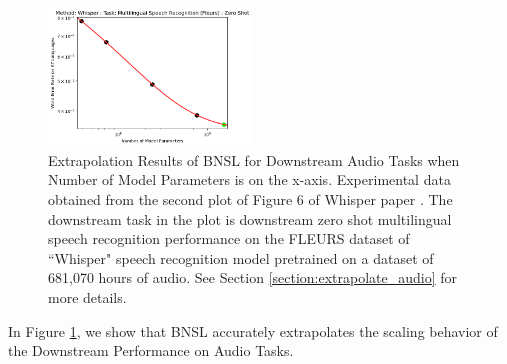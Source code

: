 \documentclass{article} %
\begin{document}
\begin{figure}[htbp]
    \centering
\includegraphics[width=0.48\textwidth]{figures/audio/whisper__parameter_scaling.png}

    \caption{
Extrapolation Results of BNSL for Downstream Audio Tasks when Number of Model Parameters is on the x-axis. Experimental data obtained from the second plot of Figure 6 of Whisper paper \citep{radford2022robust}. The downstream task in the plot is downstream zero shot multilingual speech recognition performance on the FLEURS dataset of ``Whisper" speech recognition model pretrained on a dataset of 681,070 hours of audio. See Section \ref{section:extrapolate_audio} for more details.
    }
    \label{fig:extrapolate_audio}
\end{figure}

In Figure \ref{fig:extrapolate_audio}, we show that BNSL accurately extrapolates the scaling behavior of the Downstream Performance on Audio Tasks.

\clearpage


\end{document}
